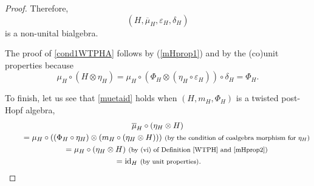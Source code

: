 \documentclass[10pt,a4paper]{amsart}
\numberwithin{equation}{section}
\begin{document}
\begin{proof}
Therefore,
\[
(H,\overline{\mu}_{H},\varepsilon_{H},\delta_{H})
\]
is a non-unital bialgebra.

The proof of \eqref{cond1WTPHA} follows by (\ref{mHprop1}) and by the (co)unit properties because
\[{\mu}_{H}\circ(H\otimes\eta_{H})=\mu_{H}\circ(\Phi_{H}\otimes(\eta_{H}\circ\varepsilon_{H}))\circ\delta_{H}=\Phi_{H}.\]

To finish, let us see that \eqref{muetaid} holds when $(H,m_{H},\Phi_{H})$ is a twisted post-Hopf algebra,
\begin{gather*}
 \overline{\mu}_{H}\circ(\eta_{H}\otimes H)\\
 \qquad{}= \mu_{H}\circ((\Phi_{H}\circ\eta_{H})\otimes(m_{H}\circ(\eta_{H}\otimes H)))\ \text{\footnotesize\textnormal{(by the condition of coalgebra morphism for $\eta_{H}$)}}\\
 \qquad{}= \mu_{H}\circ(\eta_{H}\otimes H)\ \text{\footnotesize\textnormal{(by (vi) of Definition \ref{WTPH} and \eqref{mHprop2})}}\\
 \qquad{}= {\rm id}_{H}\ \text{\footnotesize\textnormal{(by unit properties)}}. \tag*{\qed}
\end{gather*}
\renewcommand{\qed}{}
\end{proof}
\end{document}
